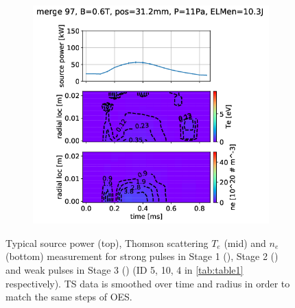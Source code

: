 \begin{figure}[ht!]
\begin{subfigure}{0.285\textwidth}
         \vspace*{-55mm}
         {\color{white}\caption{\phantom{ }}\label{fig:TSa}}
     \end{subfigure}
     \hfill
     \begin{subfigure}{0.341\textwidth}
         \centering
         \vspace*{-0mm}
         \includegraphics[width=\textwidth,trim={110 0 70 25},clip]{Chapters/chapter3/figs/pass_1_merge97_global_fit41.png}
         \vspace*{-55mm}
         {\color{white}\caption{\phantom{ }}\label{fig:TSc}}
     \end{subfigure}
        \vspace*{+45mm}
        \caption{Typical source power (top), Thomson scattering $T_e$ (mid) and $n_e$ (bottom) measurement for strong pulses in Stage 1 (), Stage 2 () and weak pulses in Stage 3 () (ID 5, 10, 4 in \autoref{tab:table1} respectively). TS data is smoothed over time and radius in order to match the same steps of OES.
        }
        \label{fig:TS1}
\end{figure}

